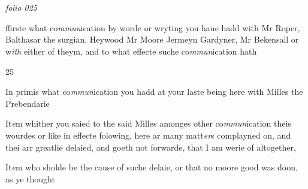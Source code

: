 \documentclass[12pt, a4paper]{book}
\begin{document}
\dotfill
					  \section*{}  \subsection*{}

\textit{folio 025}




		\ifthenelse{\isodd{\thepage}}
		{\reversemarginpar}
		{\normalmarginpar}
		ffirste what co\textit{mmun}ication by worde or wryting you haue hadd
	with Mr Roper, Balthasar the surgian, Heywood Mr Moore
	Jermeyn Gardyner, Mr Bekensall or w\textit{ith} either of theym, and
 to what effecte suche co\textit{mmun}ication hath
            		\begin{flushright}{\color{Mahogany}25}\end{flushright}
            		
            			
				\marginpar[\vspace{0.5cm}{\textcolor{Gray}{+n}}]{}
			
            			
		\ifthenelse{\isodd{\thepage}}
		{\reversemarginpar}
		{\normalmarginpar}
		In primis what co\textit{mmun}ication you hadd at your laste being here
            				with Milles the Prebendarie
            		
				\marginpar[\vspace{0.5cm}{\textcolor{Gray}{+n}}]{}
			
		\ifthenelse{\isodd{\thepage}}
		{\reversemarginpar}
		{\normalmarginpar}
		It\textit{e}m whither you saied to the said Milles amonges other co\textit{mmun}ication
 theis wourdes or like in effecte folowing, here ar many matt\textit{er}s
 complayned on, and thei arr greatlie delaied, and goeth not
 forwarde, that I am werie of altogether,
            		
				\marginpar[\vspace{0.5cm}{\textcolor{Gray}{n}}]{}
			
		\ifthenelse{\isodd{\thepage}}
		{\reversemarginpar}
		{\normalmarginpar}
		It\textit{e}m who sholde be the cause of suche delaie, or that no moore
 good was doon, as ye thought
            		
				\marginpar[\vspace{0.5cm}{\textcolor{Gray}{n}}]{}
			
\end{document}
